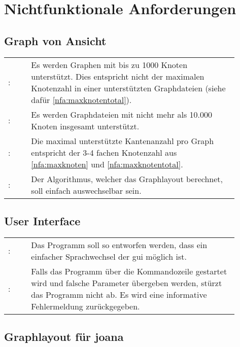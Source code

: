 \chapter{Nichtfunktionale Anforderungen}
\label{ch:nfa}

\setcounter{nfanr}{10}
\newcommand{\nfano}{\ifnum\value{nfanr}<10 00\else\ifnum\value{nfanr}<100 0\fi\fi\arabic{nfanr}}
\newcommand\nfa[2]{\namedlabel{nfa:#1}{/NFA\nfano/}\addtocounter{nfanr}{10}: & #2 \\ [1ex] }

\section{Graph von Ansicht}

\begin{tabular}{lp{0.9\linewidth}}
  \nfa{maxknoten}{Es werden Graphen mit bis zu 1000 Knoten unterstützt. Dies entspricht nicht der maximalen Knotenzahl in einer unterstützten Graphdateien (siehe dafür \ref{nfa:maxknotentotal}).}
  \nfa{maxknotentotal}{Es werden Graphdateien mit nicht mehr als 10.000 Knoten insgesamt unterstützt.}
  \nfa{maxkanten}{Die maximal unterstützte Kantenanzahl pro Graph entspricht der 3-4 fachen Knotenzahl aus \ref{nfa:maxknoten} und \ref{nfa:maxknotentotal}.}
  \nfa{algowechsel}{Der Algorithmus, welcher das Graphlayout berechnet, soll einfach auswechselbar sein.}
\end{tabular}

\section{User Interface}\label{sec:nfaui}
\setcounter{nfanr}{100}
\begin{tabular}{lp{0.9\linewidth}}
  \nfa{sprachwechsel}{Das Programm soll so entworfen werden, dass ein einfacher Sprachwechsel der \gls{gui} möglich ist.}
  \nfa{cmdfehler}{Falls das Programm über die Kommandozeile gestartet wird und falsche Parameter übergeben werden, stürzt das Programm nicht ab. Es wird eine informative Fehlermeldung zurückgegeben.}
\end{tabular}

\section{Graphlayout für \gls{joana}}\label{sec:nfajoana}
\setcounter{nfanr}{200}

